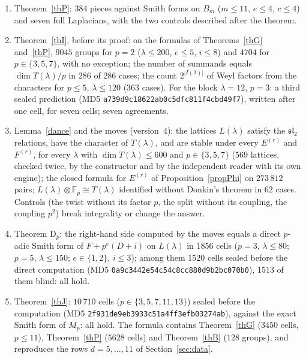 \documentclass[10pt]{article}
\theoremstyle{ds}
\theoremstyle{dsrem}
\newcommand{\F}{\mathbb{F}}
\begin{document}
\begin{enumerate}
\begin{itemize}
\end{itemize}
\item Theorem~\ref{thP}: $384$ pieces against Smith forms on $B_m$ ($m\le11$, $e\le4$, $c\le4$) and seven full Laplacians, with the two controls described after the theorem.
\item Theorem~\ref{thI}, before its proof: on the formulas of Theorems~\ref{thG} and~\ref{thP}, $9045$ groups for $p=2$ ($\lambda\le200$, $e\le5$, $i\le8$) and $4704$ for $p\in\{3,5,7\}$, with no exception; the number of summands equals $\dim T(\lambda)/p$ in $286$ of $286$ cases; the count $2^{|I(\lambda)|}$ of Weyl factors from the characters for $p\le5$, $\lambda\le120$ ($363$ cases). For the block $\lambda=12$, $p=3$: a third sealed prediction (MD5 \texttt{a739d9c1\allowbreak 8622ab0c\allowbreak 5dfc811f\allowbreak 4cbd49f7}), written after one cell, for seven cells; seven agreements.
\item Lemma~\ref{dance} and the moves (version~4): the lattices $L(\lambda)$ satisfy the $\mathfrak{sl}_2$ relations, have the character of $T(\lambda)$, and are stable under every $E^{(r)}$ and $F^{(r)}$, for every $\lambda$ with $\dim T(\lambda)\le600$ and $p\in\{3,5,7\}$ ($569$ lattices, checked twice, by the constructor and by the independent reader with its own engine); the closed formula for $E^{(r)}$ of Proposition~\ref{propPhi} on $273\,812$ pairs; $L(\lambda)\otimes\F_p\cong T(\lambda)$ identified without Donkin's theorem in $62$ cases. Controls (the twist without its factor $p$, the split without its coupling, the coupling $p^2$) break integrality or change the answer.
\item Theorem D$_p$: the right-hand side computed by the moves equals a direct $p$-adic Smith form of $F+p^e(D+i)$ on $L(\lambda)$ in $1856$ cells ($p=3$, $\lambda\le80$; $p=5$, $\lambda\le150$; $e\in\{1,2\}$, $i\le3$); among them $1520$ cells sealed before the direct computation (MD5 \texttt{0a9c3442\allowbreak e54c54c8\allowbreak cc880d9b\allowbreak 2bc070b0}), $1513$ of them blind: all hold.
\item Theorem~\ref{thJ}: $10\,710$ cells ($p\in\{3,5,7,11,13\}$) sealed before the computation (MD5 \texttt{2f931de9\allowbreak eb3933c5\allowbreak 1a4ff3ef\allowbreak b03274ab}), against the exact Smith form of $M_p$: all hold. The formula contains Theorem~\ref{thG} ($3450$ cells, $p\le11$), Theorem~\ref{thP} ($5628$ cells) and Theorem~\ref{thB} ($128$ groups), and reproduces the rows $d=5,\dots,11$ of Section~\ref{sec:data}.

\end{enumerate}
\end{document}
